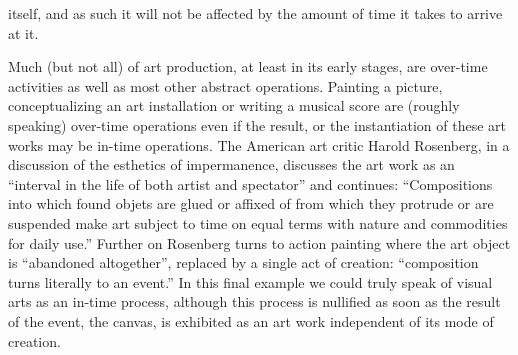 itself, and as such it will not be affected by the amount of time it takes to arrive at it. 

Much (but not all) of art production, at least in its early stages, are over-time activities as well as most other abstract operations. Painting a picture, conceptualizing an art installation or writing a musical score are (roughly speaking) over-time operations even if the result, or the instantiation of these art works may be in-time operations. The American art critic Harold Rosenberg, in a discussion of the esthetics of impermanence, discusses the art work as an ``interval in the life of both artist and spectator'' and continues: ``Compositions into which found objets are glued or affixed of from which they protrude or are suspended make art subject to time on equal terms with nature and commodities for daily use.'' \parencite[92]{rosenberg66} Further on Rosenberg turns to action painting where the art object is ``abandoned altogether'', replaced by a single act of creation: ``composition turns literally to an event.'' \parencite[93]{rosenberg66} In this final example we could truly speak of visual arts as an in-time process, although this process is nullified as soon as the result of the event, the canvas, is exhibited as an art work independent of its mode of creation.


